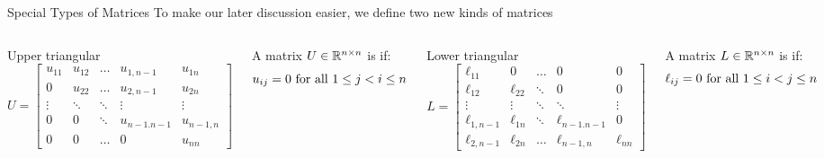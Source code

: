 \documentclass[xcoler=dvipsnames, aspectratio=169]{beamer}
\begin{document}
    \begin{frame}{Special Types of Matrices}
        To make our later discussion easier, we define two new kinds of matrices\pause
        \begin{columns}
            Upper triangular
            \pause
            \[
                U = \begin{bmatrix}
                    u_{11} & u_{12} & \dots & u_{1,n-1}& u_{1n}\\
                    0 & u_{22} & \dots & u_{2,n-1} & u_{2n}\\
                    \vdots & \ddots & \ddots & \vdots & \vdots\\
                    0 & 0 & \ddots & u_{n-1.n-1} & u_{n-1,n}\\
                    0 & 0 & \dots & 0 & u_{nn}
                \end{bmatrix}
            \]
            \pause
            \begin{defn}
                A matrix $U\in\mathbb{R}^{n\times n}$ is  if:\pause
                \[
                    u_{ij} = 0 \textnormal{ for all } 1\leq j < i \leq n
                \]
            \end{defn}
            Lower triangular
            \pause
            \[
                L = \begin{bmatrix}
                    \ell_{11}   & 0 & \dots  &0           & 0 \\
                    \ell_{12}   & \ell_{22} & \ddots  &0           & 0 \\
                    \vdots      & \vdots    & \ddots & \ddots         & \vdots\\
                    \ell_{1,n-1}& \ell_{1n}         & \ddots & \ell_{n-1.n-1} & 0\\
                    \ell_{2,n-1}& \ell_{2n}         & \dots  & \ell_{n-1,n}   & \ell_{nn}
                \end{bmatrix}
            \]
            \pause
            \begin{defn}
                A matrix $L\in\mathbb{R}^{n\times n}$ is  if:\pause
                \[
                    \ell_{ij} = 0 \textnormal{ for all } 1\leq i < j \leq n
                \]
            \end{defn}
        \end{columns}
    \end{frame}
\end{document}

